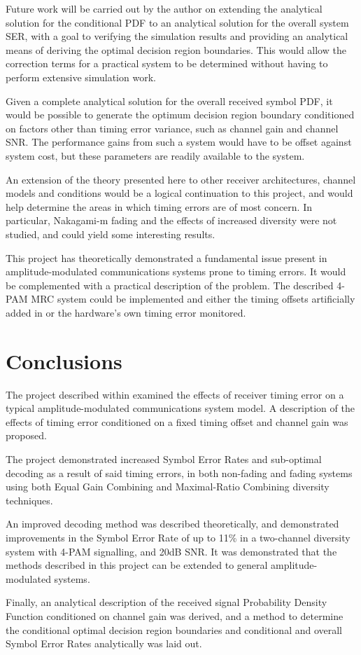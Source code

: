 Future work will be carried out by the author on extending the analytical solution for the conditional PDF to an analytical solution for the overall system SER, with a goal to verifying the simulation results and providing an analytical means of deriving the optimal decision region boundaries. This would allow the correction terms for a practical system to be determined without having to perform extensive simulation work.

Given a complete analytical solution for the overall received symbol PDF, it would be possible to generate the optimum decision region boundary conditioned on factors other than timing error variance, such as channel gain and channel SNR. The performance gains from such a system would have to be offset against system cost, but these parameters are readily available to the system.

An extension of the theory presented here to other receiver architectures, channel models and conditions would be a logical continuation to this project, and would help determine the areas in which timing errors are of most concern. In particular, Nakagami-m fading and the effects of increased diversity were not studied, and could yield some interesting results.

This project has theoretically demonstrated a fundamental issue present in amplitude-modulated communications systems prone to timing errors. It would be complemented with a practical description of the problem. The described 4-PAM MRC system could be implemented and either the timing offsets artificially added in or the hardware's own timing error monitored.

\chapter{Conclusions}

The project described within examined the effects of receiver timing error on a typical amplitude-modulated communications system model. A description of the effects of timing error conditioned on a fixed timing offset and channel gain was proposed.

The project demonstrated increased Symbol Error Rates and sub-optimal decoding as a result of said timing errors, in both non-fading and fading systems using both Equal Gain Combining and Maximal-Ratio Combining diversity techniques.

An improved decoding method was described theoretically, and demonstrated improvements in the Symbol Error Rate of up to 11\% in a two-channel diversity system with 4-PAM signalling, and 20dB SNR. It was demonstrated that the methods described in this project can be extended to general amplitude-modulated systems.

Finally, an analytical description of the received signal Probability Density Function conditioned on channel gain was derived, and a method to determine the conditional optimal decision region boundaries and conditional and overall Symbol Error Rates analytically was laid out.